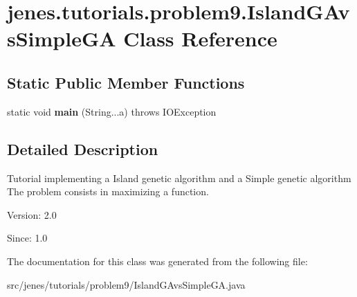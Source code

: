 \hypertarget{classjenes_1_1tutorials_1_1problem9_1_1_island_g_avs_simple_g_a}{
\section{jenes.tutorials.problem9.IslandGAvsSimpleGA Class Reference}
\label{classjenes_1_1tutorials_1_1problem9_1_1_island_g_avs_simple_g_a}
}
\subsection*{Static Public Member Functions}
\begin{CompactItemize}
\item 
\hypertarget{classjenes_1_1tutorials_1_1problem9_1_1_island_g_avs_simple_g_a_20124a96736560ad40f38c5cf057c8df}{
static void \textbf{main} (String...a)  throws IOException }
\label{classjenes_1_1tutorials_1_1problem9_1_1_island_g_avs_simple_g_a_20124a96736560ad40f38c5cf057c8df}

\end{CompactItemize}


\subsection{Detailed Description}
Tutorial implementing a Island genetic algorithm and a Simple genetic algorithm The problem consists in maximizing a function.

\begin{Desc}
\item[Version:]2.0 \end{Desc}
\begin{Desc}
\item[Since:]1.0 \end{Desc}


The documentation for this class was generated from the following file:\begin{CompactItemize}
\item 
src/jenes/tutorials/problem9/IslandGAvsSimpleGA.java\end{CompactItemize}

